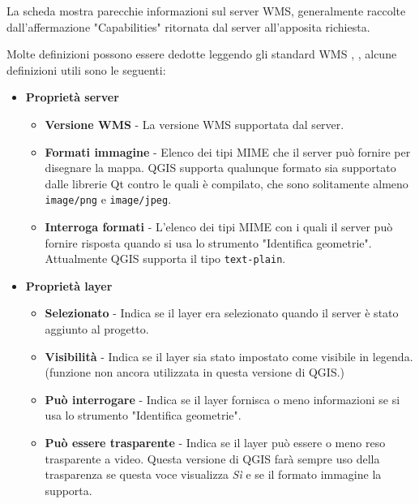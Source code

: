 La scheda  mostra parecchie informazioni sul server WMS,
generalmente raccolte dall'affermazione "Capabilities" ritornata dal server all'apposita richiesta.

Molte definizioni possono essere dedotte leggendo gli standard WMS \cite{OGCWMS010101web}, \cite{OGCWMS010300web}, alcune definizioni utili sono le seguenti:

\begin{itemize}
\item \textbf{Proprietà server}

\begin{itemize}
\item \textbf{Versione WMS}      - La versione WMS supportata dal server.

\item \textbf{Formati immagine}  - Elenco dei tipi MIME che il server può
                                   fornire  per disegnare la mappa. QGIS
				   supporta qualunque formato sia supportato
				   dalle librerie Qt contro le quali è
				   compilato, che sono solitamente almeno \texttt{image/png}
				   e \texttt{image/jpeg}.

\item \textbf{Interroga formati} - L'elenco dei tipi MIME con i quali il server
                                   può fornire risposta quando si usa lo strumento
				   "Identifica geometrie". Attualmente QGIS supporta
				   il tipo \texttt{text-plain}.

\end{itemize}

\item \textbf{Proprietà layer}

\begin{itemize}
\item \textbf{Selezionato}         - Indica se il layer era selezionato quando
                                     il server è stato aggiunto al progetto.

\item \textbf{Visibilità}          - Indica se il layer sia stato impostato
                                     come visibile in legenda.  (funzione non ancora utilizzata
				     in questa versione di QGIS.)

\item \textbf{Può interrogare}     - Indica se il layer fornisca o meno
                                     informazioni se si usa lo strumento "Identifica geometrie".

\item \textbf{Può essere trasparente} - Indica se il layer può essere o meno
                                        reso trasparente a video. Questa
					versione di QGIS farà sempre uso della
					trasparenza se questa voce visualizza
					\textsl{Sì} e se il formato immagine
					la supporta.


\end{itemize}
\end{itemize}
